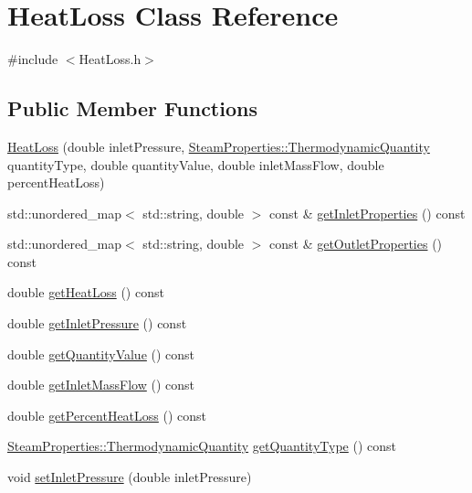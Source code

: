 \hypertarget{class_heat_loss}{}\section{Heat\+Loss Class Reference}
\label{class_heat_loss}


{\ttfamily \#include $<$Heat\+Loss.\+h$>$}

\subsection*{Public Member Functions}
\begin{DoxyCompactItemize}
\item 
\hyperlink{class_heat_loss_a1c1bba4ef783d97e2ed63f39f625e82f}{Heat\+Loss} (double inlet\+Pressure, \hyperlink{class_steam_properties_ae0294bedf7d178c2d8fb6aed0f62fbff}{Steam\+Properties\+::\+Thermodynamic\+Quantity} quantity\+Type, double quantity\+Value, double inlet\+Mass\+Flow, double percent\+Heat\+Loss)
\item 
std\+::unordered\+\_\+map$<$ std\+::string, double $>$ const  \& \hyperlink{class_heat_loss_ac9fe13c199ec41ef6fafe85523a27040}{get\+Inlet\+Properties} () const
\item 
std\+::unordered\+\_\+map$<$ std\+::string, double $>$ const  \& \hyperlink{class_heat_loss_adddb2b3d6bff26a377219901381919f3}{get\+Outlet\+Properties} () const
\item 
double \hyperlink{class_heat_loss_acc39533782f4f5cbf902d36f7bfc53b0}{get\+Heat\+Loss} () const
\item 
double \hyperlink{class_heat_loss_a09e6e05477fd6794ea7f42bb43da2f50}{get\+Inlet\+Pressure} () const
\item 
double \hyperlink{class_heat_loss_a7f7fd85e4fc8bf96dcc213f3dd44ecf7}{get\+Quantity\+Value} () const
\item 
double \hyperlink{class_heat_loss_ad11a428f99a4945628f66adecb88bf5a}{get\+Inlet\+Mass\+Flow} () const
\item 
double \hyperlink{class_heat_loss_acbbf01db5cde157057e4d766cab22382}{get\+Percent\+Heat\+Loss} () const
\item 
\hyperlink{class_steam_properties_ae0294bedf7d178c2d8fb6aed0f62fbff}{Steam\+Properties\+::\+Thermodynamic\+Quantity} \hyperlink{class_heat_loss_a92dc973c0fd81df192207b3df55d6c2b}{get\+Quantity\+Type} () const
\item 
void \hyperlink{class_heat_loss_ab0a6b1f2a964d161d25758318f25f7e3}{set\+Inlet\+Pressure} (double inlet\+Pressure)
\item 

\end{DoxyCompactItemize}
